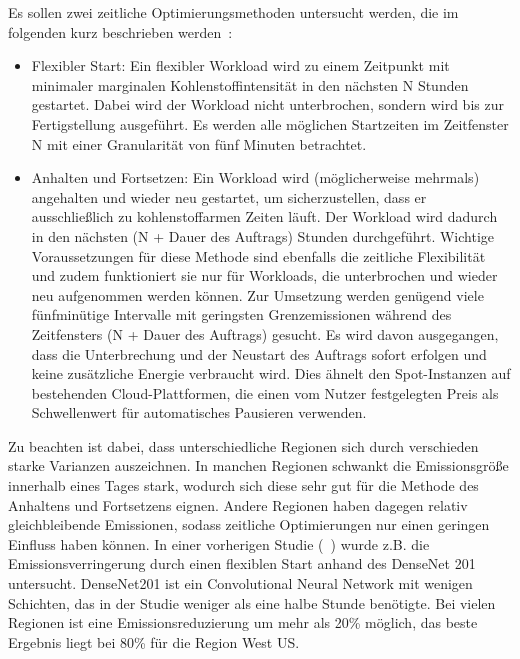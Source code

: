 Es sollen zwei zeitliche Optimierungsmethoden untersucht werden, die im folgenden kurz beschrieben werden~\cite{Dodge.06212022}:
\begin{itemize}
 \item Flexibler Start: Ein flexibler Workload wird zu einem Zeitpunkt mit minimaler marginalen Kohlenstoffintensität in den nächsten N Stunden gestartet.
 Dabei wird der Workload nicht unterbrochen, sondern wird bis zur Fertigstellung ausgeführt.
 Es werden alle möglichen Startzeiten im Zeitfenster N mit einer Granularität von fünf Minuten betrachtet.
 \item Anhalten und Fortsetzen: Ein Workload wird (möglicherweise mehrmals) angehalten und wieder neu gestartet, um sicherzustellen, dass er ausschließlich zu kohlenstoffarmen Zeiten läuft.
 Der Workload wird dadurch in den nächsten (N + Dauer des Auftrags) Stunden durchgeführt.
 Wichtige Voraussetzungen für diese Methode sind ebenfalls die zeitliche Flexibilität und zudem funktioniert sie nur für Workloads, die unterbrochen und wieder neu aufgenommen werden können.
 Zur Umsetzung werden genügend viele fünfminütige Intervalle mit geringsten Grenzemissionen während des Zeitfensters (N + Dauer des Auftrags) gesucht.
 Es wird davon ausgegangen, dass die Unterbrechung und der Neustart des Auftrags sofort erfolgen und keine zusätzliche Energie verbraucht wird.
 Dies ähnelt den Spot-Instanzen auf bestehenden Cloud-Plattformen, die einen vom Nutzer festgelegten Preis als Schwellenwert für automatisches Pausieren verwenden.
\end {itemize}
Zu beachten ist dabei, dass unterschiedliche Regionen sich durch verschieden starke Varianzen auszeichnen.
In manchen Regionen schwankt die Emissionsgröße innerhalb eines Tages stark, wodurch sich diese sehr gut für die Methode des Anhaltens und Fortsetzens eignen.
Andere Regionen haben dagegen relativ gleichbleibende Emissionen, sodass zeitliche Optimierungen nur einen geringen Einfluss haben können.
In einer vorherigen Studie (~\cite{Dodge.06212022}) wurde z.B. die Emissionsverringerung durch einen flexiblen Start anhand des DenseNet 201 untersucht.
DenseNet201 ist ein Convolutional Neural Network mit wenigen Schichten, das in der Studie weniger als eine halbe Stunde benötigte.
Bei vielen Regionen ist eine Emissionsreduzierung um mehr als 20\% möglich, das beste Ergebnis liegt bei 80\% für die Region West US\@.
